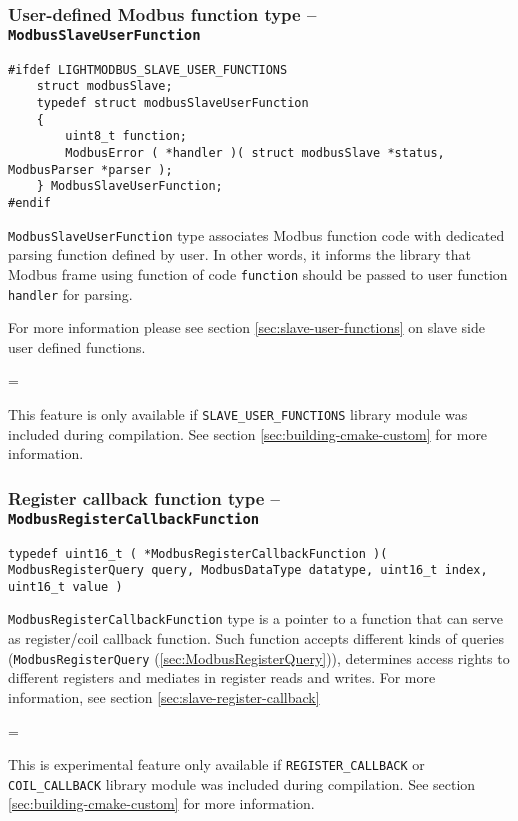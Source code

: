 \documentclass[11pt,a4paper]{article}
\newenvironment{warning}
{
	\par\begin{mdframed}[linewidth=0.5pt,linecolor=black]%
	\begin{list}{}{\leftmargin=1cm
	\labelwidth=\leftmargin}\item[\Large\ding{43}]
}
{	
	\end{list}\end{mdframed}\par
}
\newcommand{\coderef}[1]{\texttt{{#1}} (\ref{sec:#1})}
\newcommand{\warnbox}[1]{\vspace{0.2cm}\begin{warning}{#1}\end{warning}\vspace{0.2cm}}
\begin{document}
\subsubsection{User-defined Modbus function type -- \texttt{ModbusSlaveUserFunction}} \label{sec:ModbusSlaveUserFunction}
\begin{lstlisting}[style=cstyle]
#ifdef LIGHTMODBUS_SLAVE_USER_FUNCTIONS
	struct modbusSlave;
	typedef struct modbusSlaveUserFunction
	{
		uint8_t function;
		ModbusError ( *handler )( struct modbusSlave *status, ModbusParser *parser );
	} ModbusSlaveUserFunction;
#endif
\end{lstlisting}

\texttt{ModbusSlaveUserFunction} type associates Modbus function code with dedicated parsing function defined by user. In other words, it informs the library that Modbus frame using function of code \texttt{function} should be passed to user function \texttt{handler} for parsing.\newline

For more information please see section \ref{sec:slave-user-functions} on slave side user defined functions.

\warnbox{This feature is only available if \texttt{SLAVE\_USER\_FUNCTIONS} library module was included during compilation. See section \ref{sec:building-cmake-custom} for more information. }


\subsubsection{Register callback function type -- \texttt{ModbusRegisterCallbackFunction}} \label{sec:ModbusRegisterCallbackFunction}
\begin{lstlisting}[style=cproto]
typedef uint16_t ( *ModbusRegisterCallbackFunction )( ModbusRegisterQuery query, ModbusDataType datatype, uint16_t index, uint16_t value )
\end{lstlisting}

\texttt{ModbusRegisterCallbackFunction} type is a pointer to a function that can serve as register/coil callback function. Such function accepts different kinds of queries (\coderef{ModbusRegisterQuery}), determines access rights to different registers and mediates in register reads and writes. For more information, see section \ref{sec:slave-register-callback}

\warnbox{This is experimental feature only available if \texttt{REGISTER\_CALLBACK} or \texttt{COIL\_CALLBACK} library module was included during compilation. See section \ref{sec:building-cmake-custom} for more information. }
\end{document}
